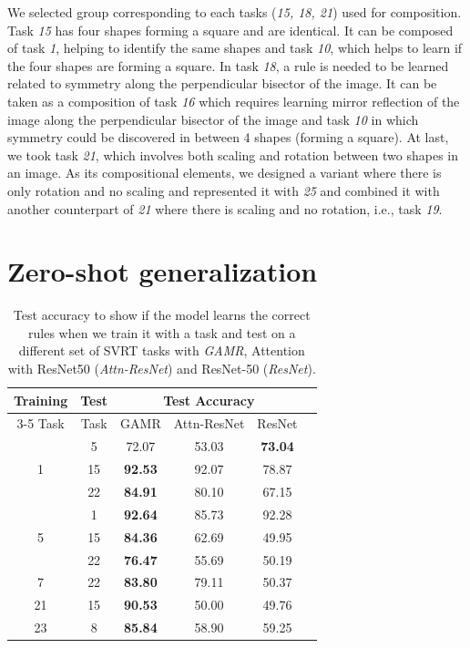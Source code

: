 We selected group corresponding to each tasks (\textit{15, 18, 21}) used for composition. Task \textit{15} has four shapes forming a square and are identical. It can be composed of task \textit{1}, helping to identify the same shapes and task \textit{10}, which helps to learn if the four shapes are forming a square. In task \textit{18}, a rule is needed to be learned related to symmetry along the perpendicular bisector of the image. It can be taken as a composition of task \textit{16} which requires learning mirror reflection of the image along the perpendicular bisector of the image and task \textit{10} in which symmetry could be discovered in between 4 shapes (forming a square). At last, we took task \textit{21}, which involves both scaling and rotation between two shapes in an image. As its compositional elements, we designed a variant where there is only rotation and no scaling and represented it with \textit{25} and combined it with another counterpart of \textit{21} where there is scaling and no rotation, i.e., task \textit{19}.


\section{Zero-shot generalization}
\label{sec:zeroshot}

\begin{table}[htbp]
\centering
    \begin{tabular}{cccccc}
\hline
Training            & Test & \multicolumn{3}{c}{Test Accuracy} \\\cline{3-5} 
Task            & Task & GAMR & Attn-ResNet & ResNet \\ \hline
\midrule
\multirow{3}{*}{1}  & 5    & 72.07          & 53.03 &  \textbf{73.04} \\
                    & 15   & \textbf{92.53} & 92.07 &   78.87  \\
                    & 22   & \textbf{84.91} & 80.10 &   67.15  \\\hline
\multirow{3}{*}{5}  & 1    & \textbf{92.64} & 85.73 &   92.28    \\
                    & 15   & \textbf{84.36} & 62.69 &   49.95    \\
                    & 22   & \textbf{76.47} & 55.69 &   50.19    \\\hline
7                   & 22   & \textbf{83.80} & 79.11 &   50.37   \\\hline
21                  & 15   & \textbf{90.53} & 50.00 &   49.76   \\\hline
23                  & 8    & \textbf{85.84} & 58.90 &   59.25   \\ 
\bottomrule
\end{tabular}

\caption{Test accuracy to show if the model learns the correct rules when we train it with a task and test on a different set of SVRT tasks with \textit{GAMR}, Attention with ResNet50 (\textit{Attn-ResNet}) and ResNet-50 (\textit{ResNet}).}
\label{tab:transfer}
\end{table}


